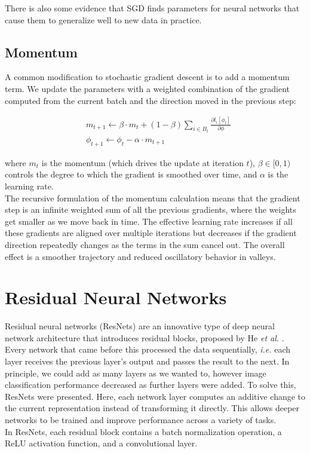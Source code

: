 \noindent There is also some evidence that SGD finds parameters for neural networks that cause them to generalize well to new data in practice.

\subsection{Momentum}
A common modification to stochastic gradient descent is to add a momentum term. We update the parameters with a weighted combination of the gradient computed from the current batch and the direction moved in the previous step:

\begin{equation}
    \begin{aligned}
    & m_{t+1} \longleftarrow \beta \cdot m_{t}+(1-\beta) \sum_{i \in B_{t}} \frac{\partial l_{i}\left[\phi_{t}\right]}{\partial \phi} \\ 
    & \phi_{t+1} \longleftarrow \phi_{t}-\alpha \cdot m_{t+1}
    \end{aligned}
\end{equation}

\noindent where $m_{t}$ is the momentum (which drives the update at iteration $t$), $\beta \in [0, 1)$ controls the degree to which the gradient is smoothed over time, and $\alpha$ is the learning rate. \\
The recursive formulation of the momentum calculation means that the gradient step is an infinite weighted sum of all the previous gradients, where the weights get smaller as we move back in time. The effective learning rate increases if all these gradients are aligned over multiple iterations but decreases if the gradient direction repeatedly changes as the terms in the sum cancel out. The overall effect is a smoother trajectory and reduced oscillatory behavior in valleys.

\section{Residual Neural Networks}
Residual neural networks (ResNets) are an innovative type of deep neural network architecture that introduces residual blocks, proposed by He \textit{et al.} \cite{he2016deep}. \\
Every network that came before this processed the data sequentially, \textit{i.e.} each layer receives the previous layer’s output and passes the result to the next. In principle, we could add as many layers as we wanted to, however image classification performance decreased as further layers were added. To solve this, ResNets were presented. Here, each network layer computes an additive change to the current representation instead of transforming it directly. This allows deeper networks to be trained and improve performance across a variety of tasks. \\
In ResNets, each residual block contains a batch normalization operation, a ReLU activation function, and a convolutional layer.

